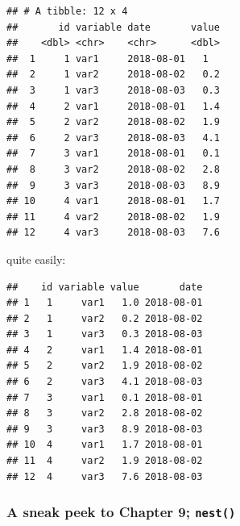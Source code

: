 \documentclass[]{gitbook}
\newenvironment{Shaded}{\begin{snugshade}}{\end{snugshade}}
\newcommand{\DataTypeTok}[1]{\textcolor[rgb]{0.13,0.29,0.53}{#1}}
\newcommand{\DecValTok}[1]{\textcolor[rgb]{0.00,0.00,0.81}{#1}}
\newcommand{\KeywordTok}[1]{\textcolor[rgb]{0.13,0.29,0.53}{\textbf{#1}}}
\newcommand{\NormalTok}[1]{#1}
\newcommand{\OperatorTok}[1]{\textcolor[rgb]{0.81,0.36,0.00}{\textbf{#1}}}
\newcommand{\OtherTok}[1]{\textcolor[rgb]{0.56,0.35,0.01}{#1}}
\newcommand{\StringTok}[1]{\textcolor[rgb]{0.31,0.60,0.02}{#1}}
\theoremstyle{definition}
\theoremstyle{definition}
\theoremstyle{definition}
\theoremstyle{remark}
\begin{document}
\begin{verbatim}
## # A tibble: 12 x 4
##       id variable date       value
##    <dbl> <chr>    <chr>      <dbl>
##  1     1 var1     2018-08-01   1  
##  2     1 var2     2018-08-02   0.2
##  3     1 var3     2018-08-03   0.3
##  4     2 var1     2018-08-01   1.4
##  5     2 var2     2018-08-02   1.9
##  6     2 var3     2018-08-03   4.1
##  7     3 var1     2018-08-01   0.1
##  8     3 var2     2018-08-02   2.8
##  9     3 var3     2018-08-03   8.9
## 10     4 var1     2018-08-01   1.7
## 11     4 var2     2018-08-02   1.9
## 12     4 var3     2018-08-03   7.6
\end{verbatim}

quite easily:

\begin{Shaded}
\end{Shaded}

\begin{verbatim}
##    id variable value       date
## 1   1     var1   1.0 2018-08-01
## 2   1     var2   0.2 2018-08-02
## 3   1     var3   0.3 2018-08-03
## 4   2     var1   1.4 2018-08-01
## 5   2     var2   1.9 2018-08-02
## 6   2     var3   4.1 2018-08-03
## 7   3     var1   0.1 2018-08-01
## 8   3     var2   2.8 2018-08-02
## 9   3     var3   8.9 2018-08-03
## 10  4     var1   1.7 2018-08-01
## 11  4     var2   1.9 2018-08-02
## 12  4     var3   7.6 2018-08-03
\end{verbatim}

\hypertarget{a-sneak-peek-to-chapter-9-nest}{%
\subsubsection{\texorpdfstring{A sneak peek to Chapter 9;
\texttt{nest()}}{A sneak peek to Chapter 9; nest()}}\label{a-sneak-peek-to-chapter-9-nest}}
\end{document}
